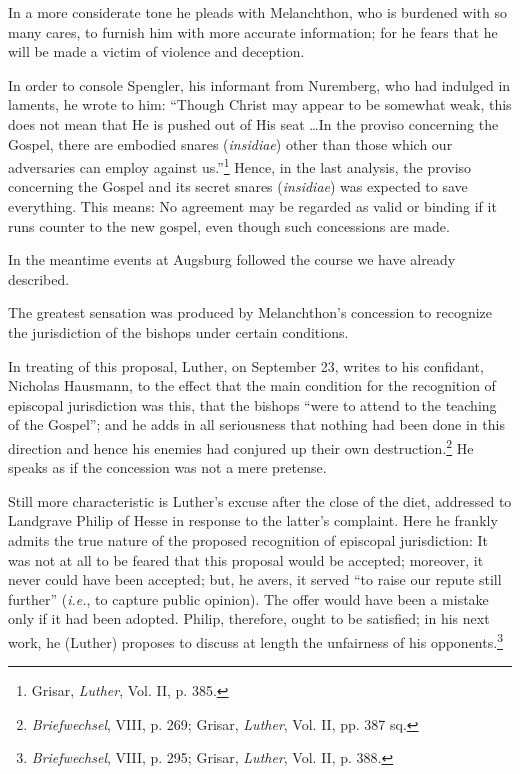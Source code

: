 In a more considerate tone he pleads with Melanchthon, who is burdened
with so many cares, to furnish him with more accurate information; for
he fears that he will be made a victim of violence and
deception.

In order to console Spengler, his informant from Nuremberg, who
had indulged in laments, he wrote to him: “Though Christ may
appear to be somewhat weak, this does not mean that He is pushed out
of His seat \dots In the proviso concerning the Gospel, there are embodied
snares (\textit{insidiae}) other than those which our adversaries can
employ against us.”\footnote{Grisar, \textit{Luther}, Vol. II, p. 385.}
Hence, in the last analysis, the proviso concerning
the Gospel and its secret snares (\textit{insidiae}) was expected to save
everything. This means: No agreement may be regarded as valid or
binding if it runs counter to the new gospel, even though such concessions are made.

In the meantime events at Augsburg followed the course we have
already described.

The greatest sensation was produced by Melanchthon’s concession
to recognize the jurisdiction of the bishops under certain conditions.

In treating of this proposal, Luther, on September 23, writes to his
confidant, Nicholas Hausmann, to the effect that the main condition
for the recognition of episcopal jurisdiction was this, that the bishops
“were to attend to the teaching of the Gospel”; and he adds in all
seriousness that nothing had been done in this direction and hence
his enemies had conjured up their own destruction.\footnote{\textit{Briefwechsel}, VIII, p. 269; Grisar, \textit{Luther}, Vol. II, pp. 387 sq.}
 He speaks as if
the concession was not a mere pretense.

Still more characteristic is Luther’s excuse after the close of the
diet, addressed to Landgrave Philip of Hesse in response to the latter’s
complaint. Here he frankly admits the true nature of the proposed recognition
of episcopal jurisdiction: It was not at all to be
feared that this proposal would be accepted; moreover, it never could
have been accepted; but, he avers, it served “to raise our repute still
further” (\textit{i.e.}, to capture public opinion). The offer would have been
a mistake only if it had been adopted. Philip, therefore, ought to be
satisfied; in his next work, he (Luther) proposes to discuss at length
the unfairness of his opponents.\footnote{\textit{Briefwechsel}, VIII, p. 295; Grisar, \textit{Luther}, Vol. II, p. 388.}

